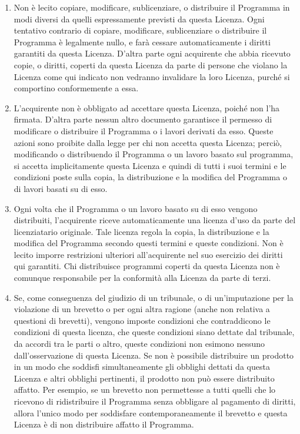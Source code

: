 \begin{enumerate}
\item Non \`e lecito copiare, modificare, sublicenziare, o
  distribuire il Programma in modi diversi da quelli
  espressamente previsti da questa Licenza. Ogni tentativo
  contrario di copiare, modificare, sublicenziare o
  distribuire il Programma \`e legalmente nullo, e far\`a
  cessare automaticamente i diritti garantiti da questa
  Licenza. D'altra parte ogni acquirente che abbia ricevuto
  copie, o diritti, coperti da questa Licenza da parte di
  persone che violano la Licenza come qui indicato non
  vedranno invalidare la loro Licenza, purch\'e si
  comportino conformemente a essa.

\item L'acquirente non \`e obbligato ad accettare questa
  Licenza, poich\'e non l'ha firmata. D'altra parte nessun
  altro documento garantisce il permesso di modificare o
  distribuire il Programma o i lavori derivati da esso.
  Queste azioni sono proibite dalla legge per chi non
  accetta questa Licenza; perci\`o, modificando o
  distribuendo il Programma o un lavoro basato sul
  programma, si accetta implicitamente questa Licenza e
  quindi di tutti i suoi termini e le condizioni poste sulla
  copia, la distribuzione e la modifica del Programma o di
  lavori basati su di esso.

\item Ogni volta che il Programma o un lavoro basato su di
  esso vengono distribuiti, l'acquirente riceve
  automaticamente una licenza d'uso da parte del
  licenziatario originale. Tale licenza regola la copia, la
  distribuzione e la modifica del Programma secondo questi
  termini e queste condizioni. Non \`e lecito imporre
  restrizioni ulteriori all'acquirente nel suo esercizio dei
  diritti qui garantiti. Chi distribuisce programmi coperti
  da questa Licenza non \`e comunque responsabile per la
  conformit\`a alla Licenza da parte di terzi.

\item Se, come conseguenza del giudizio di un tribunale, o
  di un'imputazione per la violazione di un brevetto o per
  ogni altra ragione (anche non relativa a questioni di
  brevetti), vengono imposte condizioni che contraddicono le
  condizioni di questa licenza, che queste condizioni siano
  dettate dal tribunale, da accordi tra le parti o altro,
  queste condizioni non esimono nessuno dall'osservazione di
  questa Licenza. Se non \`e possibile distribuire un
  prodotto in un modo che soddisfi simultaneamente gli
  obblighi dettati da questa Licenza e altri obblighi
  pertinenti, il prodotto non pu\`o essere distribuito
  affatto. Per esempio, se un brevetto non permettesse a
  tutti quelli che lo ricevono di ridistribuire il Programma
  senza obbligare al pagamento di diritti, allora l'unico
  modo per soddisfare contemporaneamente il brevetto e
  questa Licenza \`e di non distribuire affatto il
  Programma.


\end{enumerate}
